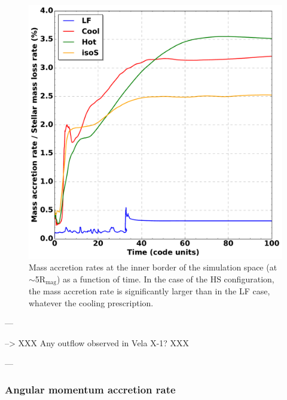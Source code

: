 \documentclass{aa}
\begin{document}
\begin{figure}
\centering
\includegraphics[width=0.95\columnwidth]{Pictures/mdot_time.pdf}
\caption{Mass accretion rates at the inner border of the simulation space (at $\sim$5R$_{\text{mag}}$) as a function of time. In the case of the HS configuration, the mass accretion rate is significantly larger than in the LF case, whatever the cooling prescription.}
\label{fig:mdot_time}
\end{figure} 

---

--> XXX Any outflow observed in Vela X-1? XXX

---


\subsubsection{Angular momentum accretion rate}
\label{sec:ldot}
\end{document}
